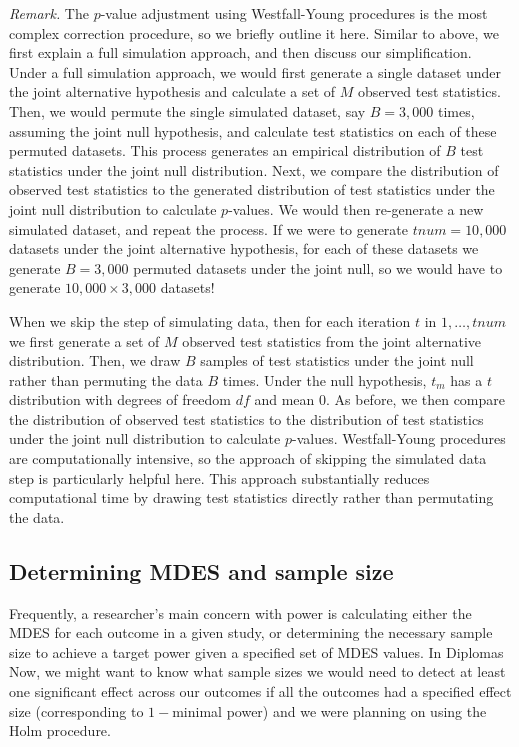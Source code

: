 \documentclass{article}
\begin{document}
\emph{Remark.} The \(p\)-value adjustment using Westfall-Young
procedures is the most complex correction procedure, so we briefly
outline it here. Similar to above, we first explain a full simulation
approach, and then discuss our simplification. Under a full simulation
approach, we would first generate a single dataset under the joint
alternative hypothesis and calculate a set of \(M\) observed test
statistics. Then, we would permute the single simulated dataset, say
\(B = 3,000\) times, assuming the joint null hypothesis, and calculate
test statistics on each of these permuted datasets. This process
generates an empirical distribution of \(B\) test statistics under the
joint null distribution. Next, we compare the distribution of observed
test statistics to the generated distribution of test statistics under
the joint null distribution to calculate \(p\)-values. We would then
re-generate a new simulated dataset, and repeat the process. If we were
to generate \(tnum = 10,000\) datasets under the joint alternative
hypothesis, for each of these datasets we generate \(B = 3,000\)
permuted datasets under the joint null, so we would have to generate
\(10,000 \times 3,000\) datasets!

When we skip the step of simulating data, then for each iteration \(t\)
in \(1, \dots, tnum\) we first generate a set of \(M\) observed test
statistics from the joint alternative distribution. Then, we draw \(B\)
samples of test statistics under the joint null rather than permuting
the data \(B\) times. Under the null hypothesis, \(t_m\) has a \(t\)
distribution with degrees of freedom \(df\) and mean \(0\). As before,
we then compare the distribution of observed test statistics to the
distribution of test statistics under the joint null distribution to
calculate \(p\)-values. Westfall-Young procedures are computationally
intensive, so the approach of skipping the simulated data step is
particularly helpful here. This approach substantially reduces
computational time by drawing test statistics directly rather than
permutating the data.

\subsection{Determining MDES and sample size}
\label{sec:est_mdes_ss}

Frequently, a researcher's main concern with power is calculating either
the MDES for each outcome in a given study, or determining the necessary
sample size to achieve a target power given a specified set of MDES
values. In Diplomas Now, we might want to know what sample sizes we
would need to detect at least one significant effect across our outcomes
if all the outcomes had a specified effect size (corresponding to
\(1-\)minimal power) and we were planning on using the Holm procedure.
\end{document}
